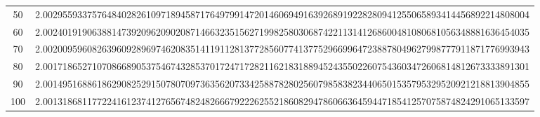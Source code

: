 \documentclass[final]{article}
\begin{document}
\begin{table}
\begin{center}
\begin{tabular}{|c|c|}
			50  &  2.002955933757648402826109718945871764979914720146069491639268919228280941255065893414456892214808004 \\ 
			60  &  2.002401919063881473920962090208714663235156271998258030687422113141268600481080681056348881636454035 \\
			70  &  2.002009596082639609289697462083514119112813772856077413775296699647238878049627998777911871776993943 \\
			80  &  2.001718652710708668905375467432853701724717282116218318894524355022607543603472606814812673333891301 \\
			90  &  2.001495168861862908252915078070973635620733425887828025607985838234406501535795329520921218813904855 \\
			100 &  2.001318681177224161237412765674824826667922262552186082947860663645944718541257075874824291065133597 \\
			\hline
			\hline
		\end{tabular}
	\end{center}
	\bigskip\bigskip
\end{table}
\end{document}
